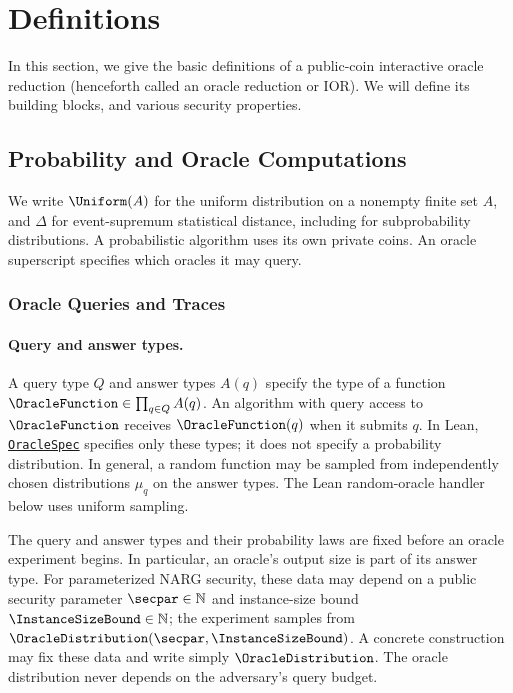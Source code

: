 \section{Definitions}\label{sec:oracle_reductions_defs}

In this section, we give the basic definitions of a public-coin interactive oracle reduction
(henceforth called an oracle reduction or IOR). We will define its building blocks, and various
security properties.

\subsection{Probability and Oracle Computations}
\label{sec:finite_probability_interface}

We write \(\Uniform(A)\) for the uniform distribution on a nonempty finite set \(A\),
and \(\Delta\) for event-supremum statistical distance, including for subprobability distributions.
A probabilistic algorithm uses its own private coins. An oracle superscript specifies
which oracles it may query.

\subsubsection{Oracle Queries and Traces}
\label{sec:oracle_trace_interface}

\paragraph{Query and answer types.}
A query type \(Q\) and answer types \(A(q)\) specify the type of a function
\(\OracleFunction\in\prod_{q\in Q}A(q)\). An algorithm with query access to \(\OracleFunction\)
receives \(\OracleFunction(q)\) when it submits \(q\). In Lean,
\href{../docs/find/\#doc/OracleSpec}{\texttt{OracleSpec}}
specifies only these types; it does not specify a probability distribution.
In general, a random function may be sampled from independently chosen
distributions \(\mu_q\) on the answer types. The Lean random-oracle handler
below uses uniform sampling.

The query and answer types and their probability laws are fixed before an oracle experiment begins. In particular, an oracle's output size is part of its answer type. For parameterized NARG security, these data may depend on a public security parameter \(\secpar\in\mathbb N\) and instance-size bound \(\InstanceSizeBound\in\mathbb N\); the experiment samples from \(\OracleDistribution(\secpar,\InstanceSizeBound)\). A concrete construction may fix these data and write simply \(\OracleDistribution\). The oracle distribution never depends on the adversary's query budget.

